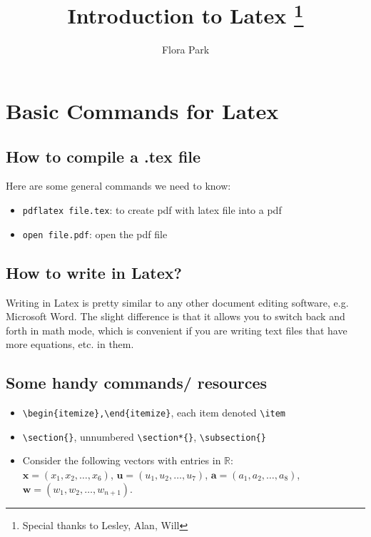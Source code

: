 \documentclass[11pt]{article}
\newcommand{\code}[1]{\texttt{#1}}
\newcommand{\R}{{\mathbb R}}
\renewcommand{\vector}[1]{(x_1,x_2,\ldots,x_{#1})} %
\newcommand{\avector}[2]{(#1_1,#1_2,\ldots,#1_{#2})}
\newcommand{\aDEFvector}[2][a]{(#1_1,#1_2,\ldots,#1_{#2})}
\begin{document}
\title{Introduction to Latex \thanks{Special thanks to Lesley, Alan, Will}}
\author{Flora Park}

\maketitle

\section*{Basic Commands for Latex}
	\subsection*{How to compile a .tex file}
	Here are some general commands we need to know:
	\begin{itemize}
		\item \code{pdflatex file.tex}: to create pdf with latex file into a pdf
		\item \code{open file.pdf}: open the pdf file
	\end{itemize}
	\subsection*{How to write in Latex?}
	Writing in Latex is pretty similar to any other document editing software, e.g. Microsoft Word. The slight difference is that it allows you to switch back and forth in math mode, which is convenient if you are writing text files that have more equations, etc. in them.

	\subsection*{Some handy commands/ resources}
	\begin{itemize}
		\item \code{\textbackslash begin\{itemize\},\textbackslash end\{itemize\}}, each item denoted \code{\textbackslash item}
		\item \code{\textbackslash section\{\}}, unnumbered \code{\textbackslash section*\{\}}, \code{\textbackslash subsection\{\}}
		\item Consider the following vectors with entries in $\R$:\\ $\mathbf
x=\vector{6}$, $\mathbf u=\avector{u}{7}$, $\mathbf a=\aDEFvector{8}$,
$\mathbf w=\aDEFvector[w]{n+1}$.
	\end{itemize}
\end{document}
